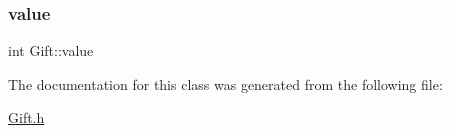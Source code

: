 \mbox{\label{class_gift_a71d14b92ebfd06993afe584f088bc748}} 
\subsubsection{\texorpdfstring{value}{value}}
{\footnotesize\ttfamily int Gift\+::value}



The documentation for this class was generated from the following file\+:\begin{DoxyCompactItemize}
\item 
\hyperlink{_gift_8h}{Gift.\+h}\end{DoxyCompactItemize}
